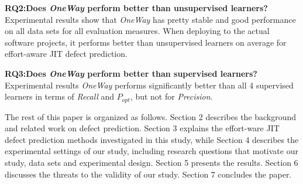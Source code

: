 \item \textbf{RQ2:Does {\it OneWay} perform  better than unsupervised learners?}\\
Experimental results show that {\it OneWay} has pretty stable and good performance on all data sets for all evaluation measures. When deploying to the actual software projects, it performs better than unsupervised learners on average for effort-aware JIT defect prediction. 

\item \textbf{RQ3:Does {\it OneWay} perform  better than supervised learners?} \\
Experimental results {\it OneWay} performs significantly better than all 4 supervised learners in terms of {\it Recall} and $P_{opt}$, but not for {\it Precision}.
\ei

The rest of this paper is organized as follows. Section 2 describes the background and related work on defect prediction.
Section 3 explains the effort-ware JIT defect prediction methods investigated in this study, while Section 4 describes the
experimental settings of our study, including research questions that motivate our study, data sets and experimental design.
Section 5 presents the results. Section 6 discusses the threats to the validity of our study. Section 7 concludes the paper.


